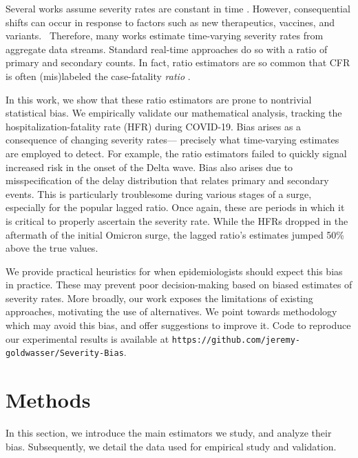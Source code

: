 \documentclass{article}
\begin{document}
Several works 
assume severity rates are constant in time \citep{nishiuraEx1, ghani, jewell2007nonparametric, reich2012estimating, lancet_controversial}. However, 
consequential shifts can occur in response to factors 
such as new therapeutics, vaccines, and variants. 
Therefore, many works estimate time-varying severity rates from aggregate data streams.
Standard real-time approaches do so with a ratio of primary and secondary counts.
In fact, ratio estimators are so common that CFR is often 
(mis)labeled the case-fatality \emph{ratio} \citep{timevar_ifr}. 

In this work, we show that these ratio estimators are prone to nontrivial
statistical bias. 
We empirically validate our mathematical analysis, 
tracking the hospitalization-fatality rate (HFR) during COVID-19.
Bias arises as a consequence of changing severity
rates---
precisely what time-varying estimates are employed to detect.
For example, the ratio estimators failed to quickly signal increased
risk in the onset of the Delta wave.
Bias also arises due to misspecification of the delay distribution that relates primary and secondary events. 
This is particularly troublesome during various stages of a surge, especially for the popular lagged ratio.
Once again, these are periods in which it is critical to properly ascertain the severity rate.
While the HFRs dropped in the aftermath of the initial Omicron surge, the lagged ratio's estimates jumped 50\% above the true values.

We provide practical heuristics for when epidemiologists should expect this bias in practice. 
These may prevent poor decision-making based on biased estimates of severity rates. 
More broadly, our work exposes the limitations of existing approaches, motivating the use of alternatives.
We point towards methodology which may avoid this bias, and offer suggestions to improve it.
Code to reproduce our experimental results is available at \texttt{https://github.com/jeremy-goldwasser/Severity-Bias}.

\section{Methods}
\label{sec:methods}

In this section, we introduce the main estimators we study, and analyze their 
bias. Subsequently, we detail the data used for empirical study and validation. 
\end{document}
